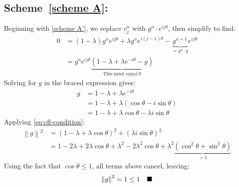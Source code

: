 \documentclass{hw_report}
\begin{document}
    \subsection*{Scheme~\ref{scheme A}:}
    Beginning with \cref{scheme A'}, we replace $v_j^n$ with $g^n \cdot e^{ij\theta}$, then simplify to find:
    \begin{equation*}
        \label{2A'}
        \begin{split}
            0&= (1-\lambda)g^n e^{ij\theta} +\lambda g^n e^{i(j-1)\theta} -\underbrace{g^{n+1}}_{=g^n\cdot g} e^{ij\theta} \\
            &=g^n e^{ij\theta} \underbrace{\left(1-\lambda +\lambda e^{-i\theta}-g\right)}_{\text{This must equal 0}}
        \end{split}
    \end{equation*}
    Solving for $g$ in the braced expression gives:
    \begin{equation*}
        \label{2A g}
        \begin{split}
            g &= 1-\lambda +\lambda e^{-i\theta}\\
            &= 1-\lambda+\lambda(\cos\theta -i\sin\theta)\\
            &=1-\lambda +\lambda\cos \theta -\lambda i\sin \theta
        \end{split}
    \end{equation*}
    Applying \cref{eq:cfl-condition}:
    \begin{equation*}
        \begin{split}
            \left\| g \right\|^2 &= \left( 1-\lambda +\lambda\cos \theta \right)^2 + \left( \lambda i\sin \theta \right)^2\\
            &= 1-2\lambda +2\lambda \cos \theta +\lambda^2 -2\lambda ^2 \cos \theta +\lambda ^2 \underbrace{\left( \cos^2 \theta +\sin^2\theta \right)}_{=1}
        \end{split}
    \end{equation*}
    Using the fact that $\cos \theta \leq 1$, all terms above cancel, leaving:
    \begin{equation*}
        \left\| g \right\|^2 =1 \leq 1 \quad \blacksquare
    \end{equation*}
\end{document}
